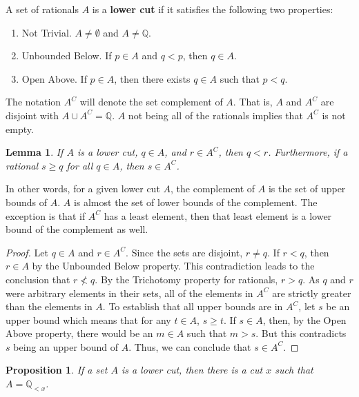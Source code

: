 \documentclass[12pt]{article}
\newtheorem{lemma}{Lemma}[section]
\newtheorem{proposition}{Proposition}[section]
\newcommand{\qcut}[2][x]{\ensuremath{\mathbb{Q}_{#2 #1}}}
\newcommand{\qlt}[1][x]{\qcut[#1]{<}}
\begin{document}
A set of rationals $A$ is a \textbf{lower cut} if it satisfies the following two properties: 
\begin{enumerate}
    \item Not Trivial. $A \neq \emptyset$ and $A \neq \mathbb{Q}$.
    \item Unbounded Below. If $p \in A$ and $q < p$, then $q \in A$. 
    \item Open Above. If $p \in A$, then there exists $q \in A$ such that $p < q$.
\end{enumerate}
The notation $A^C$ will denote the set complement of $A$. That is, $A$ and $A^C$ are disjoint with $A \cup A^C = \mathbb{Q}$. $A$ not being all of the rationals implies that $A^C$ is not empty. 

\begin{lemma}
    If $A$ is a lower cut, $q \in A$, and $r \in A^C$, then $q < r$. Furthermore, if a rational $s \geq q$ for all $q \in A$, then $s \in A^C$.
\end{lemma}

In other words, for a given lower cut $A$, the complement of $A$ is the set of upper bounds of $A$.  $A$ is almost the set of lower bounds of the complement. The exception is that if $A^C$ has a least element, then that least element is a lower bound of the complement as well. 

\begin{proof}
    Let $q \in A$ and $r \in A^C$. Since the sets are disjoint, $r \neq q$. If $r < q$, then $r \in A$ by the Unbounded Below property. This contradiction leads to the conclusion that $r \nless q$. By the Trichotomy property for rationals, $r > q$. As $q$ and $r$ were arbitrary elements in their sets, all of the elements in $A^C$ are strictly greater than the elements in $A$. To establish that all upper bounds are in $A^C$, let $s$ be an upper bound which means that for any $t \in A$, $s \geq t$. If $s \in A$, then, by the Open Above property, there would be an $m \in A$ such that $m > s$. But this contradicts $s$ being an upper bound of $A$. Thus, we can conclude that $s \in A^C$. 
\end{proof}


\begin{proposition}
    If a set $A$ is a lower cut, then there is a cut $x$ such that $A = \qlt$.
\end{proposition}
\end{document}
